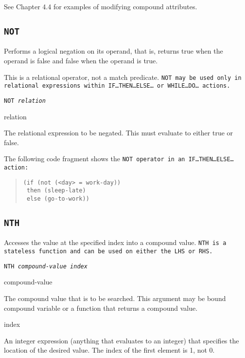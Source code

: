 See Chapter 4.4 for examples of modifying compound attributes.

\subsection{\tt{NOT}}

Performs a logical negation on its operand, that is, returns true when
the operand is false and false when the operand is true.

\begin{note}
  This is a relational operator, not a match predicate. \tt{NOT} may
  be used only in relational expressions within
  \tt{IF}\ldots\tt{THEN}\ldots\tt{ELSE}\ldots{} or
  \tt{WHILE}\ldots\tt{DO}\ldots{} actions.
\end{note}

\Format

\tt{NOT} \it{relation}

\begin{operands}
\item[relation]

  The relational expression to be negated. This must evaluate to
  either true or false.
\end{operands}

\Example

The following code fragment shows the \tt{NOT} operator in an
\tt{IF}\ldots\tt{THEN}\ldots\tt{ELSE}\ldots{} action:
\begin{quote}
\begin{verbatim}
(if (not (<day> = work-day))
 then (sleep-late)
 else (go-to-work))
\end{verbatim}
\end{quote}

\subsection{\tt{NTH}}

Accesses the value at the specified index into a compound
value. \tt{NTH} is a stateless function and can be used on either the
LHS or RHS.

\Format

\tt{NTH} \it{compound-value} \it{index}

\begin{arguments}
\item[compound-value]

  The compound value that is to be searched. This argument may be
  bound compound variable or a function that returns a compound value.

\item[index]

  An integer expression (anything that evaluates to an integer) that
  specifies the location of the desired value. The index of the first
  element is 1, not 0.
\end{arguments}

